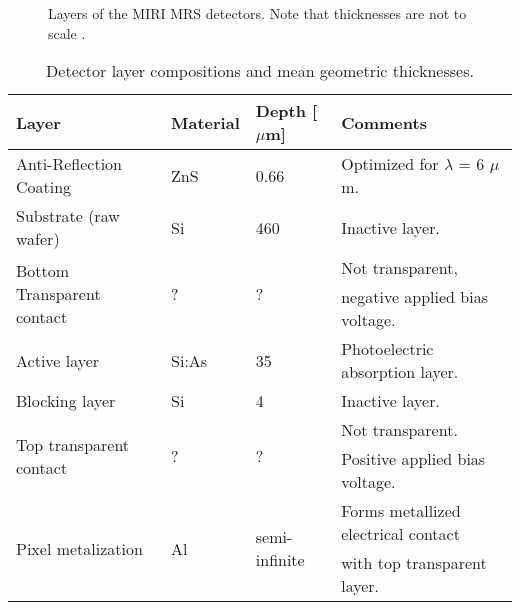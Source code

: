 \begin{figure}
	\centering
	\begin{scriptsize}
	\end{scriptsize}
	\caption{Layers of the MIRI MRS detectors. Note that thicknesses are not to scale \parencite{MIRI7}.}
	\label{fig:layers}
\end{figure}
\begin{table}[h]
	\centering
	\begin{footnotesize}
	\begin{tabular}{llll}
		\toprule
		\textbf{Layer} & \textbf{Material} & \textbf{Depth [$\mu$m]} & \textbf{Comments}\\
		\midrule 
		Anti-Reflection Coating & ZnS & 0.66 & Optimized for $\lambda$ = 6 $\mu$m.\\
		Substrate (raw wafer) & Si & 460 & Inactive layer.\\
		\multirow{2}{*}{Bottom Transparent contact} & \multirow{2}{*}{?} & \multirow{2}{*}{?} & Not transparent,\\&&& negative applied bias voltage.\\
		Active layer & Si:As & 35 & Photoelectric absorption layer.\\
		Blocking layer & Si & 4 & Inactive layer.\\
		\multirow{2}{*}{Top transparent contact} & \multirow{2}{*}{?} & \multirow{2}{*}{?} & Not transparent.\\&&& Positive applied bias voltage.\\
		\multirow{2}{*}{Pixel metalization} & \multirow{2}{*}{Al} & \multirow{2}{*}{semi-infinite} & Forms metallized electrical contact\\ &&&with top transparent layer.\\
		\bottomrule
	\end{tabular}
	\end{footnotesize}
	\caption{Detector layer compositions and mean geometric thicknesses.}
	\label{tab:layers}
\end{table}

